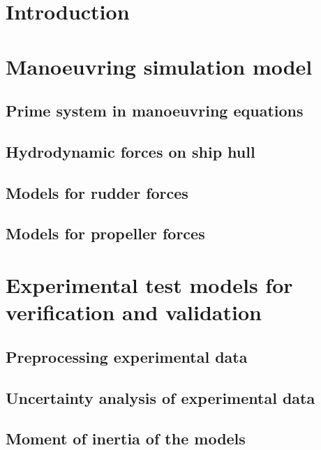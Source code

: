 \documentclass[preprint,11pt,authoryear]{elsarticle}
\begin{document}
\section{Introduction}
\label{sec:introduction}


\section{Manoeuvring simulation model} \label{sec:model}

%

\subsection{Prime system in manoeuvring equations}
\label{sec:prime_system}


\FloatBarrier
\subsection{Hydrodynamic forces on ship hull}

\subsection{Models for rudder forces}

\subsection{Models for propeller forces}

\FloatBarrier


\section{Experimental test models for verification and validation}
\label{sec:test_cases}

\FloatBarrier
\subsection{Preprocessing experimental data}

\FloatBarrier
\subsection{Uncertainty analysis of experimental data}

\FloatBarrier
\subsection{Moment of inertia of the models}

\end{document}
